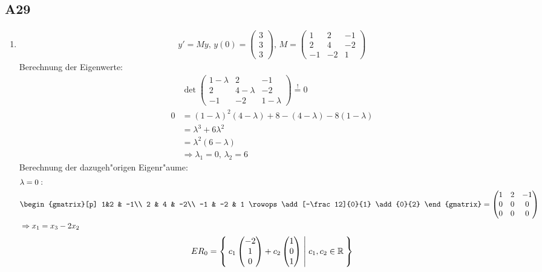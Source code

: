 \documentclass[fleqn,12pt]{scrartcl}
\begin{document}
\begin{enumerate}
	\section*{A29}
	\begin{enumerate}
		\item
			\begin{align*}
			y' = My,\, y(0) = \begin{pmatrix} 3\\3\\3\end{pmatrix},\, M = \begin{pmatrix}
				1 & 2 & -1\\
				2 & 4 & -2 \\
			-1 & -2 & 1 \end{pmatrix}
			\end{align*}
			Berechnung der Eigenwerte:
			\begin{align*}
				&\det\begin{pmatrix}
					1-\lambda & 2 & -1\\
					2 & 4 -\lambda & -2\\
					-1 & -2 & 1-\lambda
				\end{pmatrix} \overset!= 0\\
				0 &= (1-\lambda)^2(4-\lambda)+8-(4-\lambda)-8(1-\lambda)\\
					&= \lambda^3 + 6\lambda^2\\
				 &= \lambda^2(6-\lambda)\\
				 &\Rightarrow \lambda_1 = 0,\, \lambda_2 = 6
			\end{align*}
			Berechnung der dazugeh"origen Eigenr"aume:
			\begin{align*}
				&\lambda = 0:\\
				&\begin{gmatrix}[p]
					1&2 & -1\\
					2 & 4 & -2\\
					-1 & -2 & 1
					\rowops
					\add[-\frac12]{0}{1}
					\add{0}{2}
				\end{gmatrix} = \begin{pmatrix} 1 & 2 & -1 \\ 0 & 0 & 0 \\ 0 & 0 &0\end{pmatrix}\\
																					 &\Rightarrow x_1 = x_3 -2x_2\\
			\end{align*}
			\begin{align*}
			ER_0 = \Set{ c_1 \begin{pmatrix} -2\\1\\0\end{pmatrix} + c_2 \begin{pmatrix} 1 \\ 0 \\ 1\end{pmatrix} |  c_1, c_2 \in \mathbb{R}}

\end{align*}
\end{enumerate}
\end{enumerate}
\end{document}
